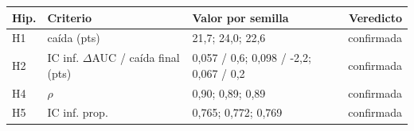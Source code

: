 \begin{tabular}{lllr}
\toprule
Hip. & Criterio & Valor por semilla & Veredicto \\
\midrule
H1 & caída (pts) & 21,7; 24,0; 22,6 & confirmada \\
H2 & IC inf. $\Delta$AUC / caída final (pts) & 0,057 / 0,6; 0,098 / -2,2; 0,067 / 0,2 & confirmada \\
H4 & $\rho$ & 0,90; 0,89; 0,89 & confirmada \\
H5 & IC inf. prop. & 0,765; 0,772; 0,769 & confirmada \\
\bottomrule
\end{tabular}
